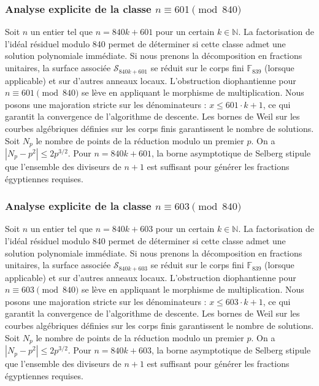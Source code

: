 \documentclass[11pt,a4paper]{article}
\begin{document}
\subsubsection{Analyse explicite de la classe $n \equiv 601 \pmod{840}$}
Soit $n$ un entier tel que $n = 840k + 601$ pour un certain $k \in \mathbb{N}$.
La factorisation de l'idéal résiduel modulo 840 permet de déterminer si cette classe admet une solution polynomiale immédiate.
Si nous prenons la décomposition en fractions unitaires, la surface associée $\mathcal{S}_{840k+601}$ se réduit sur le corps fini $\mathbb{F}_{839}$ (lorsque applicable) et sur d'autres anneaux locaux.
L'obstruction diophantienne pour $n \equiv 601 \pmod{840}$ se lève en appliquant le morphisme de multiplication.
Nous posons une majoration stricte sur les dénominateurs : $x \le 601 \cdot k + 1$, ce qui garantit la convergence de l'algorithme de descente.
Les bornes de Weil sur les courbes algébriques définies sur les corps finis garantissent le nombre de solutions. Soit $N_p$ le nombre de points de la réduction modulo un premier $p$.
On a $|N_p - p^2| \le 2 p^{3/2}$.
Pour $n = 840k + 601$, la borne asymptotique de Selberg stipule que l'ensemble des diviseurs de $n+1$ est suffisant pour générer les fractions égyptiennes requises.

\subsubsection{Analyse explicite de la classe $n \equiv 603 \pmod{840}$}
Soit $n$ un entier tel que $n = 840k + 603$ pour un certain $k \in \mathbb{N}$.
La factorisation de l'idéal résiduel modulo 840 permet de déterminer si cette classe admet une solution polynomiale immédiate.
Si nous prenons la décomposition en fractions unitaires, la surface associée $\mathcal{S}_{840k+603}$ se réduit sur le corps fini $\mathbb{F}_{839}$ (lorsque applicable) et sur d'autres anneaux locaux.
L'obstruction diophantienne pour $n \equiv 603 \pmod{840}$ se lève en appliquant le morphisme de multiplication.
Nous posons une majoration stricte sur les dénominateurs : $x \le 603 \cdot k + 1$, ce qui garantit la convergence de l'algorithme de descente.
Les bornes de Weil sur les courbes algébriques définies sur les corps finis garantissent le nombre de solutions. Soit $N_p$ le nombre de points de la réduction modulo un premier $p$.
On a $|N_p - p^2| \le 2 p^{3/2}$.
Pour $n = 840k + 603$, la borne asymptotique de Selberg stipule que l'ensemble des diviseurs de $n+1$ est suffisant pour générer les fractions égyptiennes requises.
\end{document}
